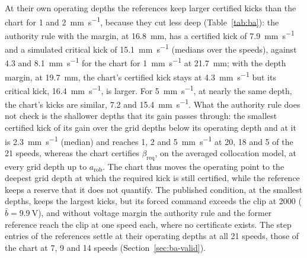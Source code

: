 At their own operating depths the references keep larger certified kicks than the chart for 1 and \SI{2}{\milli\metre\per\second}, because they cut less deep (Table~\ref{tab:ba}): the authority rule with the margin, at \SI{16.8}{\milli\metre}, has a certified kick of \SI{7.9}{\milli\metre\per\second} and a simulated critical kick of \SI{15.1}{\milli\metre\per\second} (medians over the speeds), against 4.3 and \SI{8.1}{\milli\metre\per\second} for the chart for \SI{1}{\milli\metre\per\second} at \SI{21.7}{\milli\metre}; with the depth margin, at \SI{19.7}{\milli\metre}, the chart's certified kick stays at \SI{4.3}{\milli\metre\per\second} but its critical kick, \SI{16.4}{\milli\metre\per\second}, is larger. For \SI{5}{\milli\metre\per\second}, at nearly the same depth, the chart's kicks are similar, 7.2 and \SI{15.4}{\milli\metre\per\second}. What the authority rule does not check is the shallower depths that its gain passes through: the smallest certified kick of its gain over the grid depths below its operating depth and at it is \SI{2.3}{\milli\metre\per\second} (median) and reaches 1, 2 and \SI{5}{\milli\metre\per\second} at 20, 18 and 5 of the 21 speeds, whereas the chart certifies $\beta_{\mathrm{req}}$, on the averaged collocation model, at every grid depth up to $a_{\mathrm{rob}}$. The chart thus moves the operating point to the deepest grid depth at which the required kick is still certified, while the reference keeps a reserve that it does not quantify. The published condition, at the smallest depths, keeps the largest kicks, but its forced command exceeds the clip at \SI{2000}{\rpm} ($\bar b=\SI{9.9}{\volt}$), and without voltage margin the authority rule and the former reference reach the clip at one speed each, where no certificate exists. The step entries of the references settle at their operating depths at all 21 speeds, those of the chart at 7, 9 and 14 speeds (Section~\ref{sec:ba-valid}).
